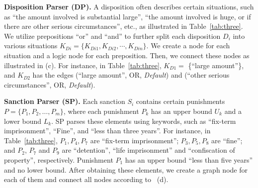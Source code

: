 \textbf{Disposition Parser (DP).} 
A disposition often describes certain situations, such as ``the amount involved is substantial large'', ``the amount involved is huge, or if there are other serious circumstances'', etc., as illustrated in Table~\ref{tab:three}. We utilize prepositions ``or'' and ``and'' to further split each disposition $D_i$ into various situations $K_{Di} = \{K_{Di1}, K_{Di2}, \cdots, K_{Din} \}$. We create a node for each situation and a logic node for each preposition. Then, we connect these nodes as illustrated in  (c). For instance, in Table~\ref{tab:three}, $K_{D1} = $ \{``large amount''\}, and $K_{D2}$ has the edges (``large amount'', OR, \emph{Default}) and (``other serious circumstances'', OR, \emph{Default}). 



\textbf{Sanction Parser (SP).} 
Each sanction $S_i$ contains certain punishments $P = \{P_1, P_2, \ldots, P_m \}$, where each punishment $P_k$ has an upper bound $U_k$ and a lower bound $L_k$. SP parses these elements using keywords, such as ``fix-term imprisonment'', ``Fine'', and ``less than three years''. For instance, in Table~\ref{tab:three}, $P_1, P_4, P_7$ are ``fix-term imprisonment''; $P_3, P_5, P_8$ are ``fine''; and $P_2$, $P_7$ and $P_9$ are ``detention'', ``life imprisonment'' and ``confiscation of property'', respectively. Punishment $P_1$ has an upper bound ``less than five years'' and no lower bound. After obtaining these elements, we create a graph node for each of them and connect all nodes according to ~(d). 

